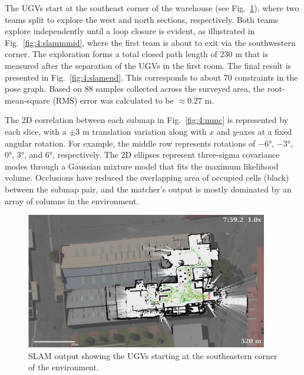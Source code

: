 The UGVs start at the southeast corner of the warehouse (see Fig.~\ref{fig:4:slamstart}), where two teams split to explore the west and north sections, respectively. Both teams explore independently until a loop closure is evident, as illustrated in Fig.~\ref{fig:4:slammmid}, where the first team is about to exit via the southwestern corner. The exploration forms a total closed path length of 230 m that is measured after the separation of the UGVs in the first room. The final result is presented in Fig.~\ref{fig:4:slamend}. This corresponds to about 70 constraints in the pose graph. Based on 88 samples collected across the surveyed area, the root-mean-square (RMS) error was calculated to be $\approx0.27$ m.


The 2D correlation between each submap in Fig.~\ref{fig:4:mmc} is represented by each slice, with a $\pm3$ m translation variation along with $x$ and $y$-axes at a fixed angular rotation. For example, the middle row represents rotations of $-6$°, $-3$°, 0°, 3°, and 6°, respectively. The 2D ellipses represent three-sigma covariance modes through a Gaussian mixture model that fits the maximum likelihood volume. Occlusions have reduced the overlapping area of occupied cells (black) between the submap pair, and the matcher’s output is mostly dominated by an array of columns in the environment.

\begin{figure}[H]
	\centering
	\includegraphics[width=0.8\linewidth]{fig7}
	\caption[SLAM output (starting)]{SLAM output showing the UGVs starting at the southeastern corner of the environment.}
	\label{fig:4:slamstart}
\end{figure}

